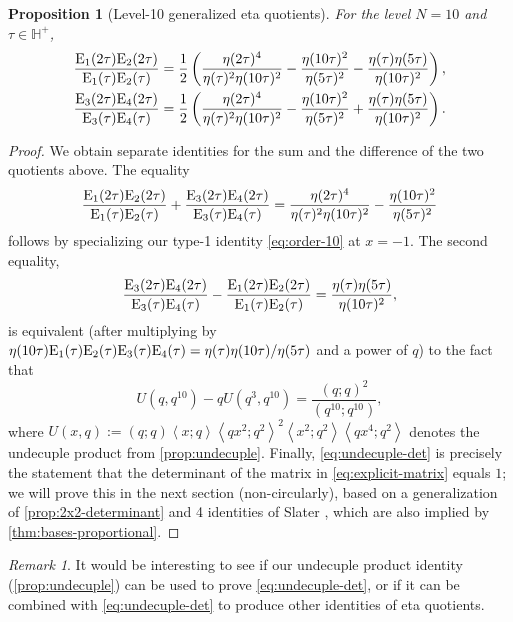 \documentclass[reqno,11pt]{amsart}
\newtheorem{proposition}[theorem]{Proposition}
\theoremstyle{definition}
\theoremstyle{remark}
\newtheorem*{remark}{Remark}
\numberwithin{equation}{section}
\renewcommand{\H}{{\mathbb{H}}}
\newcommand{\E}{\textnormal E}
\newcommand{\la}{\left\langle}
\newcommand{\ra}{\right\rangle}
\begin{document}
\begin{proposition}[Level-10 generalized eta quotients]
For the level $N = 10$ and $\tau \in \H^+$,
\begin{align*}
    \frac{\E_1(2\tau)\E_2(2\tau)}{\E_1(\tau)\E_2(\tau)}
    &=
    \frac{1}{2}\left(
    \frac{\eta(2\tau)^4}{\eta(\tau)^2\eta(10\tau)^2} - \frac{\eta(10\tau)^2}{\eta(5\tau)^2}
    - \frac{\eta(\tau)\eta(5\tau)}{\eta(10\tau)^2}
    \right),
    \\
    \frac{\E_3(2\tau)\E_4(2\tau)}{\E_3(\tau)\E_4(\tau)}
    &=
     \frac{1}{2}\left(
    \frac{\eta(2\tau)^4}{\eta(\tau)^2\eta(10\tau)^2} - \frac{\eta(10\tau)^2}{\eta(5\tau)^2}
    + \frac{\eta(\tau)\eta(5\tau)}{\eta(10\tau)^2}
    \right).
\end{align*}
\end{proposition}

\begin{proof}
We obtain separate identities for the sum and the difference of the two quotients above. The equality
\[
    \frac{\E_1(2\tau)\E_2(2\tau)}{\E_1(\tau)\E_2(\tau)} + 
    \frac{\E_3(2\tau)\E_4(2\tau)}{\E_3(\tau)\E_4(\tau)}
    =
    \frac{\eta(2\tau)^4}{\eta(\tau)^2\eta(10\tau)^2} - \frac{\eta(10\tau)^2}{\eta(5\tau)^2}
\]
follows by specializing our type-1 identity \cref{eq:order-10} at $x = -1$. The second equality,
\[
    \frac{\E_3(2\tau)\E_4(2\tau)}{\E_3(\tau)\E_4(\tau)}
    -
    \frac{\E_1(2\tau)\E_2(2\tau)}{\E_1(\tau)\E_2(\tau)}
    =
    \frac{\eta(\tau)\eta(5\tau)}{\eta(10\tau)^2},
\]
is equivalent (after multiplying by $\eta(10\tau)\E_1(\tau) \E_2(\tau) \E_3(\tau) \E_4(\tau) = \eta(\tau)\eta(10\tau)/\eta(5\tau)$ and a power of $q$) to the fact that
\begin{equation} \label{eq:undecuple-det}
    U\left(q, q^{10}\right) - qU\left(q^3, q^{10}\right) = \frac{(q; q)^2}{\left(q^{10}; q^{10}\right)},
\end{equation}
where $U(x, q) := (q; q)\la x; q \ra \la qx^2; q^2 \ra^2 \la x^2; q^2 \ra \la q x^4 ; q^2 \ra$ denotes the undecuple product from \cref{prop:undecuple}. Finally, \cref{eq:undecuple-det} is precisely the statement that the determinant of the matrix in \cref{eq:explicit-matrix} equals $1$; we will prove this in the next section (non-circularly), based on a generalization of \cref{prop:2x2-determinant} and 4 identities of Slater \cite[(94),(96),(98),(99)]{slater1952further}, which are also implied by \cref{thm:bases-proportional}. 
\end{proof}

\begin{remark}
It would be interesting to see if our undecuple product identity (\cref{prop:undecuple}) can be used to prove \cref{eq:undecuple-det}, or if it can be combined with \cref{eq:undecuple-det} to produce other identities of eta quotients.
\end{remark}
\end{document}
